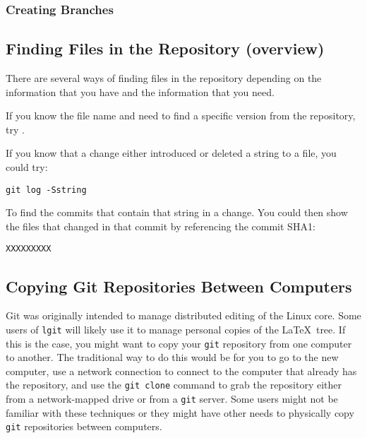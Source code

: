 \documentclass{ltxdoc}
\def\ucmd#1{{\tt {#1}}}
\begin{document}
\subsubsection{Creating Branches}

\subsection{Finding Files in the Repository (overview)}
There are several ways of finding files in the repository depending on the information that you have and the information that you need.

If you know the file name and need to find a specific version from the repository, try .

If you know that a change either introduced or deleted a string to a file, you could try:
\begin{verbatim}
git log -Sstring
\end{verbatim}
To find the commits that contain that string in a change. You could then show the files that changed in that commit  by referencing the commit SHA1:
\begin{verbatim}
XXXXXXXXX
\end{verbatim}

\subsubsection{}
\subsubsection{}
\subsubsection{}
\subsubsection{}


\subsection{Copying Git Repositories Between Computers}
Git was originally intended to manage distributed editing of the Linux core. Some users of \ucmd{lgit} will likely use it to manage personal copies of the \LaTeX\ tree.  If this is the case, you might want to copy your \ucmd{git} repository from one computer to another.  The traditional way to do this would be for you to go to the new computer, use a network connection to connect to the computer that already has the repository, and use the \ucmd{git clone} command to grab the repository either from a network-mapped drive or from a \ucmd{git} server.  Some users might not be familiar with these techniques or they might have other needs to physically copy \ucmd{git} repositories between computers.
\end{document}
